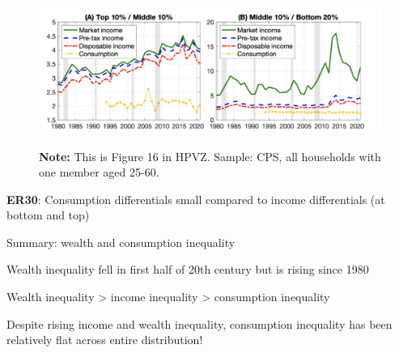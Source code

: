 \documentclass[11pt, aspectratio=169]{beamer}
\newenvironment{witemize}{\itemize\addtolength{\itemsep}{10pt}}{\enditemize}
\begin{document}
\begin{frame}{}
	\begin{figure}
		\includegraphics[scale=0.4]{./figures/inequality_consumption_1}
	\vspace*{-2mm}
	\begin{flushleft}
		{\scriptsize \hspace{6mm} \textbf{Note:} This is Figure 16 in HPVZ. Sample: CPS, all households with one member aged 25-60.}
	\end{flushleft}	
	\end{figure}

	\vspace{0mm}
	{\color{blue}\textbf{ER30}}: Consumption differentials small compared to income differentials (at bottom and top)
\end{frame}


\begin{frame}{Summary: wealth and consumption inequality}
\begin{witemize}
\item Wealth inequality fell in first half of 20th century but is rising since 1980

\item Wealth inequality > income inequality > consumption inequality

\item Despite rising income and wealth inequality, consumption inequality has been relatively flat across entire distribution! 

\end{witemize}
\end{frame}
\end{document}
